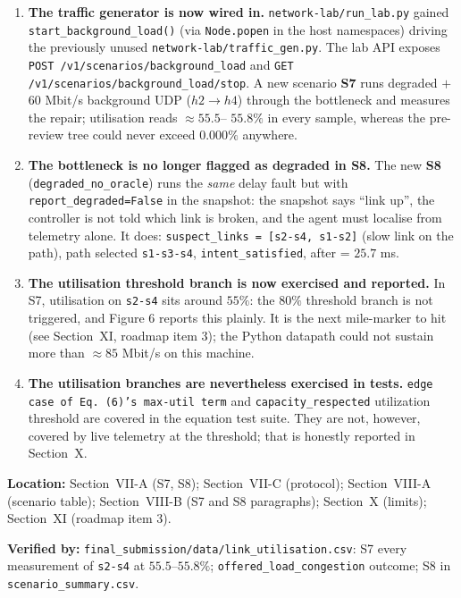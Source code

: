 \documentclass[11pt,a4paper]{article}
\begin{document}
\begin{enumerate}
\item \textbf{The traffic generator is now wired in.}
  \texttt{network-lab/run\_lab.py} gained \texttt{start\_background\_load()}
  (via \texttt{Node.popen} in the host namespaces) driving the previously
  unused \texttt{network-lab/traffic\_gen.py}. The lab API exposes
  \texttt{POST /v1/scenarios/background\_load} and
  \texttt{GET /v1/scenarios/background\_load/stop}. A new scenario
  \textbf{S7} runs degraded $+$ 60 Mbit/s background UDP ($h2 \to h4$) through
  the bottleneck and measures the repair; utilisation reads $\approx 55.5$--%
  $55.8\%$ in every sample, whereas the pre-review tree could never exceed
  $0.000\%$ anywhere.
\item \textbf{The bottleneck is no longer flagged as degraded in S8.} The
  new \textbf{S8} (\texttt{degraded\_no\_oracle}) runs the \emph{same}
  delay fault but with \texttt{report\_degraded=False} in the snapshot:
  the snapshot says ``link up'', the controller is not told which link is
  broken, and the agent must localise from telemetry alone. It does:
  \texttt{suspect\_links = [s2-s4, s1-s2]} (slow link on the path), path
  selected \texttt{s1-s3-s4}, \texttt{intent\_satisfied}, after = $25.7$ ms.
\item \textbf{The utilisation threshold branch is now exercised and reported.}
  In S7, utilisation on \texttt{s2-s4} sits around $55\%$: the $80\%$
  threshold branch is not triggered, and Figure 6 reports this plainly. It is
  the next mile-marker to hit (see Section~XI, roadmap item 3); the Python
  datapath could not sustain more than $\approx 85$ Mbit/s on this machine.
\item \textbf{The utilisation branches are nevertheless exercised in tests.}
  \texttt{edge case of Eq. (6)'s max-util term} and
  \texttt{capacity\_respected} utilization threshold are covered in the
  equation test suite. They are not, however, covered by live telemetry at
  the threshold; that is honestly reported in Section~X.
\end{enumerate}

\textbf{Location:} Section~VII-A (S7, S8); Section~VII-C (protocol);
Section~VIII-A (scenario table); Section~VIII-B (S7 and S8 paragraphs);
Section~X (limits); Section~XI (roadmap item 3).

\textbf{Verified by:}
\texttt{final\_submission/data/link\_utilisation.csv}: S7 every
measurement of \texttt{s2-s4} at $55.5$--$55.8\%$;
\texttt{offered\_load\_congestion} outcome; S8 in
\texttt{scenario\_summary.csv}.
\end{document}
